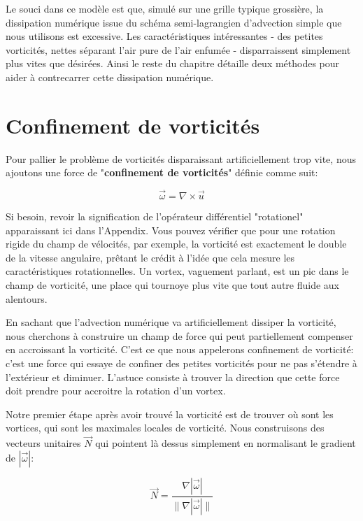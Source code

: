 \documentclass[11pt]{report}
\begin{document}
Le souci dans ce modèle est que, simulé sur une grille typique grossière, la dissipation numérique issue du schéma semi-lagrangien d'advection simple que nous utilisons est excessive. Les caractéristiques intéressantes - des petites vorticités, nettes séparant l'air pure de l'air enfumée - disparraissent simplement plus vites que désirées. Ainsi le reste du chapitre détaille deux méthodes pour aider à contrecarrer cette dissipation numérique.

\section{Confinement de vorticités}   

Pour pallier le problème de vorticités disparaissant artificiellement trop vite, nous ajoutons une force de "\textbf{confinement de vorticités}" définie comme suit:

\begin{equation}
\overrightarrow{\omega} = \nabla \times \overrightarrow{u}
\end{equation}

Si besoin, revoir la signification de l'opérateur différentiel "rotationel" apparaissant ici dans l'Appendix. Vous pouvez vérifier que pour une rotation rigide du champ de vélocités, par exemple, la vorticité est exactement le double de la vitesse angulaire, prêtant le crédit à l'idée que cela mesure les caractéristiques rotationnelles. Un vortex, vaguement parlant, est un pic dans le champ de vorticité, une place qui tournoye plus vite que tout autre fluide aux alentours.\newline

En sachant que l'advection numérique va artificiellement dissiper la vorticité, nous cherchons à construire un champ de force qui peut partiellement compenser en accroissant la vorticité. C'est ce que nous appelerons confinement de vorticité: c'est une force qui essaye de confiner des petites vorticités pour ne pas s'étendre à l'extérieur et diminuer. L'astuce consiste à trouver la direction que cette force doit prendre pour accroitre la rotation d'un vortex.\newline

Notre premier étape après avoir trouvé la vorticité est de trouver où sont les vortices, qui sont les maximales locales de vorticité. Nous construisons des vecteurs unitaires $\overrightarrow{N}$ qui pointent là dessus simplement en normalisant le gradient de $ |\overrightarrow{\omega}|$:

\begin{equation}
\overrightarrow{N} = \frac{\nabla |\overrightarrow{\omega}|}{\| \nabla |\overrightarrow{\omega}| \|}
\end{equation}
\end{document}
